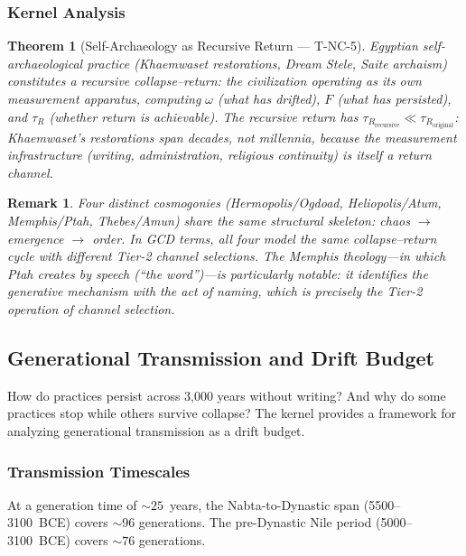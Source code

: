 \documentclass[
  aps,
  prd,
  twocolumn,
  superscriptaddress,
  nofootinbib,
  floatfix
]{revtex4-2}
\newtheorem{theorem}{Theorem}
\newtheorem{remark}{Remark}
\newcommand{\tR}{\tau_{\!R}}
\begin{document}
\subsubsection{Kernel Analysis}

\begin{theorem}[Self-Archaeology as Recursive Return
--- T-NC-5]\label{thm:selfarch}
Egyptian self-archaeological practice (Khaemwaset
restorations, Dream Stele, Saite archaism) constitutes
a recursive collapse--return: the civilization
operating as its own measurement apparatus, computing
$\omega$ (what has drifted), $F$ (what has persisted),
and $\tR$ (whether return is achievable).  The
recursive return has $\tR_{\mathrm{recursive}} \ll
\tR_{\mathrm{original}}$: Khaemwaset's restorations
span decades, not millennia, because the measurement
infrastructure (writing, administration, religious
continuity) is itself a return channel.
\end{theorem}

\begin{remark}
Four distinct cosmogonies (Hermopolis/Ogdoad,
Heliopolis/Atum, Memphis/Ptah, Thebes/Amun)
share the same structural skeleton: chaos
$\to$ emergence $\to$ order.  In GCD terms, all four
model the same collapse--return cycle with different
Tier-2 channel selections.  The Memphis theology---in
which Ptah creates by speech (``the word'')---is
particularly notable: it identifies the generative
mechanism with the \emph{act of naming}, which is
precisely the Tier-2 operation of channel selection.
\end{remark}


\subsection{Generational Transmission and Drift
Budget}\label{sec:generations}

How do practices persist across 3,000 years without
writing?  And why do some practices stop while others
survive collapse?  The kernel provides a framework for
analyzing generational transmission as a drift budget.

\subsubsection{Transmission Timescales}

At a generation time of $\sim\!25$~years, the
Nabta-to-Dynastic span (5500--3100~BCE) covers
$\sim\!96$ generations.  The pre-Dynastic Nile period
(5000--3100~BCE) covers $\sim\!76$ generations.
\end{document}
